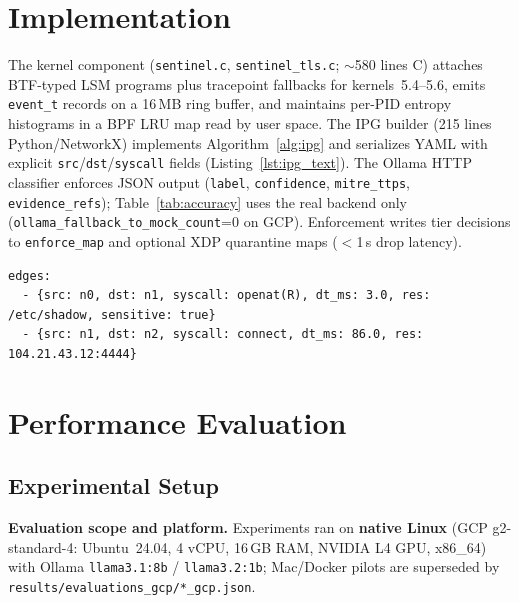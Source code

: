 \documentclass[journal]{IEEEtran}
\begin{document}
\section{Implementation}\label{sec:impl}

The kernel component (\texttt{sentinel.c}, \texttt{sentinel\_tls.c}; $\sim$580
lines C) attaches BTF-typed LSM programs plus tracepoint fallbacks for
kernels~5.4--5.6, emits \texttt{event\_t} records on a 16\,MB ring buffer, and
maintains per-PID entropy histograms in a BPF LRU map read by user space.
The IPG builder (215 lines Python/NetworkX) implements Algorithm~\ref{alg:ipg}
and serializes YAML with explicit \texttt{src}/\texttt{dst}/\texttt{syscall} fields
(Listing~\ref{lst:ipg_text}).  The Ollama HTTP classifier enforces JSON output
(\texttt{label}, \texttt{confidence}, \texttt{mitre\_ttps}, \texttt{evidence\_refs});
Table~\ref{tab:accuracy} uses the real backend only
(\texttt{ollama\_fallback\_to\_mock\_count}{=}0 on GCP).
Enforcement writes tier decisions to \texttt{enforce\_map} and optional XDP
quarantine maps ($<$1\,\textmu{}s drop latency).

\begin{lstlisting}[caption={IPG YAML excerpt (credential-theft window).},
label={lst:ipg_text}, language={}, numbers=none, basicstyle=\ttfamily\footnotesize]
edges:
  - {src: n0, dst: n1, syscall: openat(R), dt_ms: 3.0, res: /etc/shadow, sensitive: true}
  - {src: n1, dst: n2, syscall: connect, dt_ms: 86.0, res: 104.21.43.12:4444}
\end{lstlisting}

\section{Performance Evaluation}\label{sec:eval}

\subsection{Experimental Setup}\label{sec:eval_setup}

\noindent\textbf{Evaluation scope and platform.}
Experiments ran on \textbf{native Linux} (GCP g2-standard-4: Ubuntu~24.04,
4 vCPU, 16\,GB RAM, NVIDIA L4 GPU, x86\_64) with Ollama \texttt{llama3.1:8b} /
\texttt{llama3.2:1b}; Mac/Docker pilots are superseded by
\texttt{results/evaluations\_gcp/*\_gcp.json}.
\end{document}
